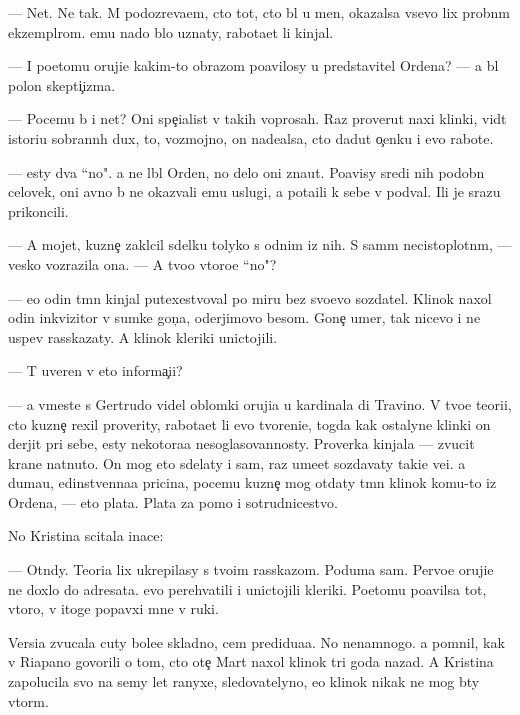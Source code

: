 \documentclass[10pt]{book}
\begin{document}
— Net. Ne tak. M{\yi} podozreva{\y}em, cto tot, cto b{\yi}l u men{\ia}, okazalsa vsevo lix probn{\yi}m ekzempl{\ia}rom. {\Y}emu nado b{\yi}lo uznaty, rabota{\y}et li kinjal.

— I poetomu oruji{\y}e kakim-to obrazom po{\y}avilosy u predstavitel{\ia} Ordena? — {\Y}a b{\yi}l polon skepti{\c}izma.

— Po\-ce\-mu b{\yi} i net? Oni spe{\c}ialist{\yi} v takih voprosah. Raz prover{\ia}{\y}ut naxi klinki, vid{\ia}t istori{\y}u sobrann{\yi}h dux, to, vozmojno, on nade{\y}alsa, cto dadut o{\c}enku i {\y}evo rabote.

— {\Y}esty dva ``no". {\Y}a ne l{\io}bl{\io} Orden, no delo oni zna{\y}ut. Po{\y}avisy sredi nih podobn{\yi}{\y} celovek, oni {\y}avno b{\yi} ne okaz{\yi}vali {\y}emu uslugi, a pota{\x}ili k sebe v podval{\yi}. Ili je srazu prikoncili.

— A mojet, kuzne{\c} zakl{\io}cil sdelku tolyko s odnim iz nih. S sam{\yi}m ne\-cisto\-plot\-n{\yi}m, — vesko vozrazila ona. — A tvo{\y}o vtoro{\y}e ``no"?

— {\Y}e{\x}o odin t{\e}mn{\yi}{\y} kinjal putexestvoval po miru bez svo{\y}evo sozdatel{\ia}. Klinok naxol odin inkvizitor v sumke gon{\c}a, oderjimovo besom. Gone{\c} umer, tak nicevo i ne uspev rasskazaty. A klinok kleriki unictojili.

— T{\yi} uveren v eto{\y} informa{\c}i{\y}i?

— {\Y}a vmeste s Gertrudo{\y} videl oblomki oruji{\y}a u kardinala di Travino. V tvo{\y}e{\y} teori{\y}i, cto kuzne{\c} rexil proverity, rabota{\y}et li {\y}evo tvoreni{\y}e, togda kak ostalyn{\yi}{\y}e klinki on derjit pri sebe, {\y}esty nekotora{\y}a nesoglasovannosty. Proverka kinjala — zvucit kra{\y}ne nat{\ia}nuto. On mog eto sdelaty i sam, raz ume{\y}et sozdavaty taki{\y}e ve{\x}i. {\Y}a duma{\y}u, {\y}edinstvenna{\y}a pricina, pocemu kuzne{\c} mog otdaty t{\e}mn{\yi}{\y} klinok komu-to iz Ordena, — eto plata. Plata za pomo{\x} i sotrudnicestvo.

No Kristina scitala inace:

— Otn{\io}dy. Teori{\y}a lix ukrepilasy s tvo{\y}im rasskazom. Poduma{\y} sam. Pervo{\y}e oruji{\y}e ne doxlo do adresata. {\Y}evo perehvatili i unictojili kleriki. Poetomu po{\y}avilsa tot, vtoro{\y}, v itoge popavxi{\y} mne v ruki.

Versi{\y}a zvucala cuty bole{\y}e skladno, cem predidu{\x}a{\y}a. No nenamnogo. {\Y}a pomnil, kak v Riapano govorili o tom, cto ote{\c} Mart naxol klinok tri goda nazad. A Kristina zapolucila svo{\y} na semy let ranyxe, sledovatelyno, {\y}e{\y}o klinok nikak ne mog b{\yi}ty vtor{\yi}m.
\end{document}
